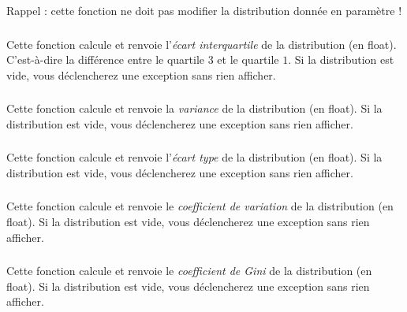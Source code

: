 \medskip

\noindent Rappel : cette fonction ne doit pas modifier la distribution donnée en paramètre !



\subsubsection*{}

\noindent Cette fonction calcule et renvoie l'\textit{écart interquartile} de la distribution (en float).
C'est-à-dire la différence entre le quartile $ 3 $ et le quartile $ 1 $.
Si la distribution est vide, vous déclencherez une exception  sans rien afficher.


\subsubsection*{}

\noindent Cette fonction calcule et renvoie la \textit{variance} de la distribution (en float).
Si la distribution est vide, vous déclencherez une exception  sans rien afficher.


\subsubsection*{}

\noindent Cette fonction calcule et renvoie l'\textit{écart type} de la distribution (en float).
Si la distribution est vide, vous déclencherez une exception  sans rien afficher.


\subsubsection*{}

\noindent Cette fonction calcule et renvoie le \textit{coefficient de variation} de la distribution (en float).
Si la distribution est vide, vous déclencherez une exception  sans rien afficher.


\subsubsection*{}

\noindent Cette fonction calcule et renvoie le \textit{coefficient de Gini} de la distribution (en float).
Si la distribution est vide, vous déclencherez une exception  sans rien afficher.
